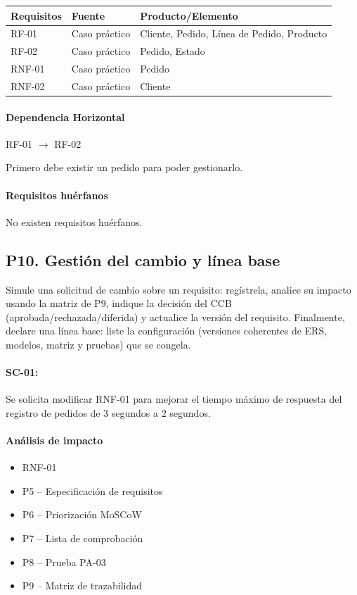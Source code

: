\documentclass[11pt,a4paper]{article}
\begin{document}
\begin{center}
\begin{tabular}{|l|l|p{7cm}|}
\hline
\rowcolor{tablehead}
\textbf{Requisitos} & \textbf{Fuente} & \textbf{Producto/Elemento} \\
\hline
RF-01  & Caso práctico & Cliente, Pedido, Línea de Pedido, Producto \\
\hline
RF-02  & Caso práctico & Pedido, Estado \\
\hline
RNF-01 & Caso práctico & Pedido \\
\hline
RNF-02 & Caso práctico & Cliente \\
\hline
\end{tabular}
\end{center}

\paragraph{Dependencia Horizontal}

RF-01 $\rightarrow$ RF-02

Primero debe existir un pedido para poder gestionarlo.

\paragraph{Requisitos huérfanos}

No existen requisitos huérfanos.

\subsection*{P10. Gestión del cambio y línea base}

Simule una solicitud de cambio sobre un requisito: regístrela, analice su impacto usando la
matriz de P9, indique la decisión del CCB (aprobada/rechazada/diferida) y actualice la versión
del requisito. Finalmente, declare una línea base: liste la configuración (versiones coherentes
de ERS, modelos, matriz y pruebas) que se congela.

\paragraph{SC-01:}
Se solicita modificar RNF-01 para mejorar el tiempo máximo de respuesta del registro de pedidos
de 3 segundos a 2 segundos.

\paragraph{Análisis de impacto}
\begin{itemize}[nosep]
  \item RNF-01
  \item P5 -- Especificación de requisitos
  \item P6 -- Priorización MoSCoW
  \item P7 -- Lista de comprobación
  \item P8 -- Prueba PA-03
  \item P9 -- Matriz de trazabilidad
\end{itemize}
\end{document}
